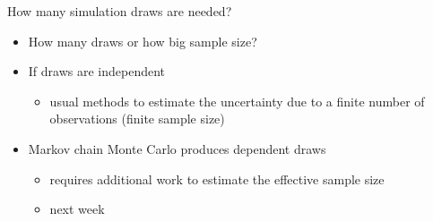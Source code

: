 \documentclass[english,t]{beamer}
\renewcommand{\emph}[1]{\textcolor{navyblue}{#1}}
\begin{document}
\begin{frame}
{How many simulation draws are needed?}

  \begin{itemize}
  \item How many draws or how big sample size?
  \item If draws are independent
    \begin{itemize}
    \item usual methods to estimate the uncertainty due to a finite
      number of observations (finite sample size)
    \end{itemize}
  \item Markov chain Monte Carlo produces dependent draws
    \begin{itemize}
    \item requires additional work to estimate the \emph{effective
        sample size}
    \item next week
    \end{itemize}
  \end{itemize}

\end{frame}
\end{document}
